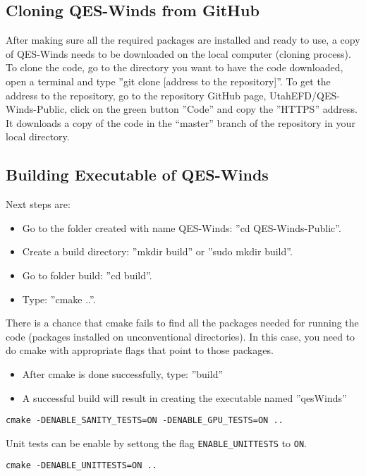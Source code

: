 \subsection{Cloning QES-Winds from GitHub}

After making sure all the required packages are installed and ready to use, a copy of QES-Winds needs to be downloaded on the local computer (cloning process). To clone the code, go to the directory you want to have the code downloaded, open a terminal and type ''git clone [address to the repository]''. To get the address to the repository, go to the repository GitHub page, UtahEFD/QES-Winds-Public, click on the green button ''Code'' and copy the ''HTTPS'' address. It downloads a copy of the code in the “master” branch of the repository in your local directory.

\subsection{Building Executable of QES-Winds}

Next steps are:
\begin{itemize}
    \item Go to the folder created with name QES-Winds: ''cd QES-Winds-Public''.
    \item Create a build directory: ''mkdir build'' or ''sudo mkdir build''.
    \item Go to folder build: ''cd build''.
    \item Type: ''cmake ..''.
\end{itemize}

There is a chance that cmake fails to find all the packages needed for running the code (packages installed on unconventional directories). In this case, you need to do cmake with appropriate flags that point to those packages.

\begin{itemize}
    \item After cmake is done successfully, type: ''build''
    \item A successful build will result in creating the executable named ''qesWinds''
\end{itemize}



\begin{verbatim}
cmake -DENABLE_SANITY_TESTS=ON -DENABLE_GPU_TESTS=ON ..
\end{verbatim}

Unit tests can be enable by settong the flag \verb|ENABLE_UNITTESTS| to \verb|ON|.
\begin{verbatim}
cmake -DENABLE_UNITTESTS=ON ..
\end{verbatim}
